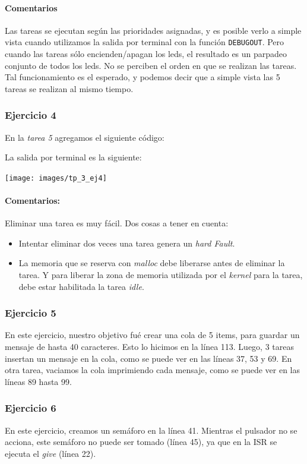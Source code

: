 \paragraph{Comentarios}
Las tareas se ejecutan según las prioridades asignadas, y es posible verlo a simple vista cuando utilizamos la salida por terminal con la función \verb|DEBUGOUT|. Pero cuando las tareas sólo encienden/apagan los leds, el resultado es un parpadeo conjunto de todos los leds. No se perciben el orden en que se realizan las tareas. Tal funcionamiento es el esperado, y podemos decir que a simple vista las 5 tareas se realizan al mismo tiempo.

\subsubsection*{Ejercicio 4}
En la \emph{tarea 5} agregamos el siguiente código:

La salida por terminal es la siguiente:

\texttt{[image: images/tp\_3\_ej4]}
\vspace{0.2cm}
\paragraph{Comentarios:}
Eliminar una tarea es muy fácil. Dos cosas a tener en cuenta: 
\begin{itemize}
    \item Intentar eliminar dos veces una tarea genera un \emph{hard Fault}.
    \item La memoria que se reserva con \emph{malloc} debe liberarse antes de eliminar la tarea. Y para liberar la zona de memoria utilizada por el \emph{kernel} para la tarea, debe estar habilitada la tarea \emph{idle}.
\end{itemize}
\subsubsection*{Ejercicio 5}
En este ejercicio, nuestro objetivo fué crear una cola de 5 items, para guardar un mensaje de hasta 40 caracteres. Esto lo hicimos en la línea 113. Luego, 3 tareas insertan un mensaje en la cola, como se puede ver en las líneas 37, 53 y 69. En otra tarea, vaciamos la cola imprimiendo cada mensaje, como se puede ver en las líneas 89 hasta 99.

\subsubsection*{Ejercicio 6}
En este ejercicio, creamos un semáforo en la línea 41. Mientras el pulsador no se acciona, este semáforo no puede ser tomado (línea 45), ya que en la ISR se ejecuta el \emph{give} (línea 22).



